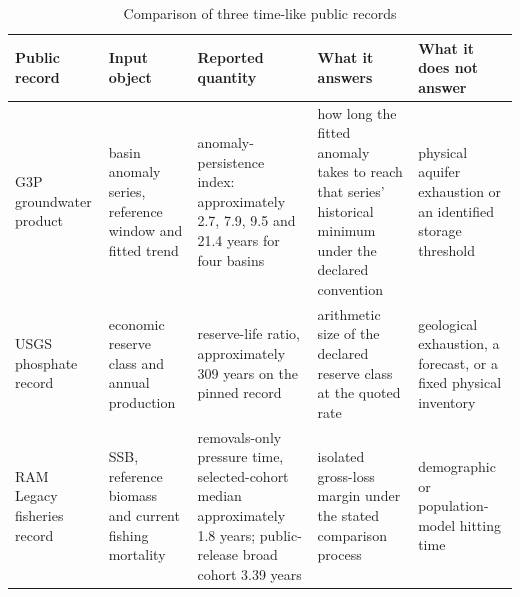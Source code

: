 \begin{table}[htbp]
\centering
\caption{Comparison of three time-like public records}
\label{tab:depletion-readings}
\small
\begin{tabularx}{\linewidth}{>{\raggedright\arraybackslash}X>{\raggedright\arraybackslash}X>{\raggedright\arraybackslash}X>{\raggedright\arraybackslash}X>{\raggedright\arraybackslash}X}
\toprule
\textbf{Public record} & \textbf{Input object} & \textbf{Reported quantity} & \textbf{What it answers} & \textbf{What it does not answer} \\
\midrule
G3P groundwater product & basin anomaly series, reference window and fitted trend & anomaly-persistence index: approximately 2.7, 7.9, 9.5 and 21.4 years for four basins & how long the fitted anomaly takes to reach that series' historical minimum under the declared convention & physical aquifer exhaustion or an identified storage threshold \\
USGS phosphate record & economic reserve class and annual production & reserve-life ratio, approximately 309 years on the pinned record & arithmetic size of the declared reserve class at the quoted rate & geological exhaustion, a forecast, or a fixed physical inventory \\
RAM Legacy fisheries record & SSB, reference biomass and current fishing mortality & removals-only pressure time, selected-cohort median approximately 1.8 years; public-release broad cohort 3.39 years & isolated gross-loss margin under the stated comparison process & demographic or population-model hitting time \\
\bottomrule
\end{tabularx}
\end{table}
